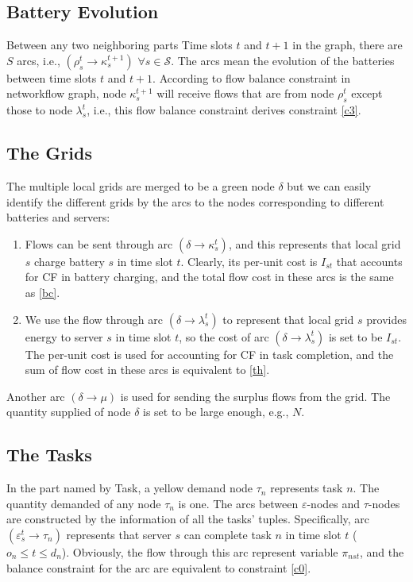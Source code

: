 \documentclass[conference, 10pt, ﬁnal, letterpaper, twocolumn]{IEEEtran}
\begin{document}
\subsection{Battery Evolution}
Between any two neighboring parts Time slots $t$ and $t+1$ in the graph, there are $S$ arcs, i.e., $(\rho^{t}_{s}\rightarrow\kappa^{t+1}_{s})$ $\forall s\in \mathcal{S}$. The arcs mean the evolution of the batteries between time slots $t$ and $t+1$. According to flow balance constraint in networkflow graph, node $\kappa^{t+1}_{s}$ will receive flows that are from node $\rho^{t}_{s}$ except those to node $\lambda^{t}_{s}$, i.e., this flow balance constraint derives constraint \eqref{c3}.

\subsection{The Grids}

The multiple local grids are merged to be a green node $\delta$ but we can easily identify the different grids by the arcs to the nodes corresponding to different batteries and servers:
\begin{enumerate}
    \item Flows can be sent through arc $(\delta \rightarrow\kappa^{t}_{s})$, and this represents that local grid $s$ charge battery $s$ in time slot $t$. Clearly, its per-unit cost is $I_{st}$ that accounts for CF in battery charging, and the total flow cost in these arcs is the same as \eqref{bc}.
    \item We use the flow through arc $(\delta \rightarrow \lambda^{t}_{s})$ to represent that local grid $s$ provides energy to server $s$ in time slot $t$, so the cost of arc $(\delta \rightarrow \lambda^{t}_{s})$ is set to be $I_{st}$. The per-unit cost is used for accounting for CF in task completion, and the sum of flow cost in these arcs is equivalent to \eqref{th}.
\end{enumerate}
Another arc $(\delta \rightarrow \mu)$ is used for sending the surplus flows from the grid. The quantity supplied of node $\delta$ is set to be large enough, e.g., $N$. 

\subsection{The Tasks} \label{sub-D}

In the part named by Task, a yellow demand node $\tau_n$ represents task $n$. The quantity demanded of any node $\tau_n$ is one. The arcs between $\varepsilon$-nodes and $\tau$-nodes are constructed by the information of all the tasks' tuples. Specifically, arc $(\varepsilon^{t}_{s}\rightarrow\tau_{n})$ represents that server $s$ can complete task $n$ in time slot $t$ ($o_n \leq t \leq d_n$). Obviously, the flow through this arc represent variable $\pi_{nst}$, and the balance constraint for the arc are equivalent to constraint \eqref{c0}.
\end{document}
